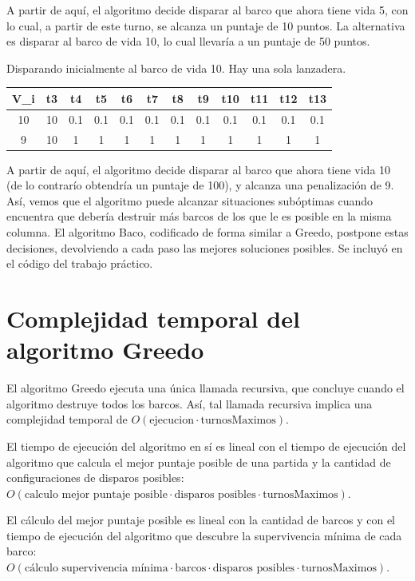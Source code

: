 \documentclass{article}
\begin{document}
A partir de aquí, el algoritmo decide disparar al barco que ahora tiene vida 5, con lo cual, a partir de este turno, se alcanza un puntaje de 10 puntos. La alternativa es disparar al barco de vida 10, lo cual llevaría a un puntaje de 50 puntos.

Disparando inicialmente al barco de vida 10. Hay una sola lanzadera. \\
\begin{center}
\begin{tabular}{ c | c c c c c c c c c c c}
\hline
V\_i &   t3 & t4 & t5 & t6 & t7 & t8 & t9 & t10 & t11 & t12 & t13 \\
\hline
10    &  10 &  0.1 &  0.1 &  0.1 & 0.1 &  0.1 &  0.1 &  0.1 &  0.1 & 0.1  & 0.1 \\
9     &  10 &  1 &  1 &  1 & 1 &  1 &  1 &  1 &  1 & 1  & 1
\end{tabular}
\end{center}

A partir de aquí, el algoritmo decide disparar al barco que ahora tiene vida 10 (de lo contrarío obtendría un puntaje de 100), y alcanza una penalización de 9.\\

Así, vemos que el algoritmo puede alcanzar situaciones subóptimas cuando encuentra que debería destruir más barcos de los que le es posible en la misma columna. El algoritmo Baco, codificado de forma similar a Greedo, postpone estas decisiones, devolviendo a cada paso las mejores soluciones posibles. Se incluyó en el código del trabajo práctico.

\section{Complejidad temporal del algoritmo Greedo}
El algoritmo Greedo ejecuta una única llamada recursiva, que concluye cuando el algoritmo destruye todos los barcos. Así, tal llamada recursiva implica una complejidad temporal de $O(\text{ejecucion} \cdot \text{turnosMaximos})$.

El tiempo de ejecución del algoritmo en sí es lineal con el tiempo de ejecución del algoritmo que calcula el mejor puntaje posible de una partida y la cantidad de configuraciones de disparos posibles: $O(\text{calculo mejor puntaje posible} \cdot \text{disparos posibles} \cdot \text{turnosMaximos})$.

El cálculo del mejor puntaje posible es lineal con la cantidad de barcos y con el tiempo de ejecución del algoritmo que descubre la supervivencia mínima de cada barco:$O(\text{cálculo supervivencia mínima} \cdot \text{barcos}  \cdot \text{disparos posibles} \cdot \text{turnosMaximos})$.
\end{document}
